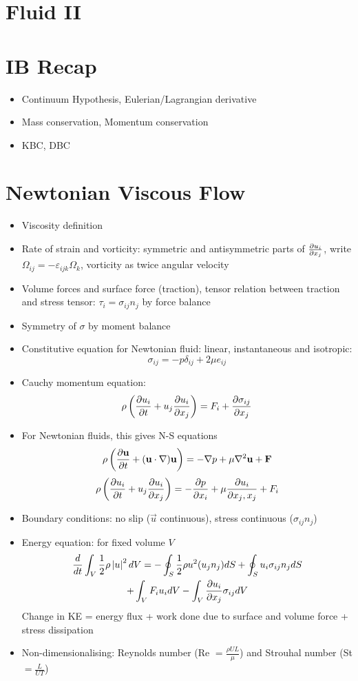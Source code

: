 


\section*{Fluid \hfill II}

\section{IB Recap}
\begin{itemize}
    \item Continuum Hypothesis, Eulerian/Lagrangian derivative
    \item Mass conservation, Momentum conservation
    \item KBC, DBC
\end{itemize}

\section{Newtonian Viscous Flow}
\begin{itemize}
    \item Viscosity definition
    \item Rate of strain and vorticity: symmetric and antisymmetric parts of $\frac{\partial{u_i}}{\partial{x_j}}$, write $\Omega_{ij} = -\varepsilon_{ijk}\Omega_k$, vorticity as twice angular velocity
    \item Volume forces and surface force (traction), tensor relation between traction and stress tensor: $\tau_i = \sigma_{ij} n_j$ by force balance
    \item Symmetry of $\sigma$ by moment balance
    \item Constitutive equation for Newtonian fluid: linear, instantaneous and isotropic: \[\sigma_{ij} = -p\delta_{ij} + 2\mu e_{ij}\]
    \item Cauchy momentum equation: \[\rho \left(\frac{\partial{u_i}}{\partial{t}} + u_j \frac{\partial{u_i}}{\partial{x_j}}\right) = F_i + \frac{\partial{\sigma_{ij}}}{\partial{x_j}} \]
    \item For Newtonian fluids, this gives N-S equations
          \[\rho \left( \frac{\partial{\boldsymbol{\mathbf{u}}}}{\partial{t}}  + (\boldsymbol{\mathbf{u}} \cdot \nabla)\boldsymbol{\mathbf{u}}  \right) = -\mathbf{\nabla} p + \mu \nabla^2 \boldsymbol{\mathbf{u}} + \boldsymbol{\mathbf{F}} \]
          \[\rho \left( \frac{\partial{u_i}}{\partial{t}}  + u_j \frac{\partial{u_i}}{\partial{x_j}} \right) = -\frac{\partial{p}}{\partial{x_i}} + \mu \frac{\partial{u_i}}{\partial{x_j,x_j}} + F_i \]
    \item Boundary conditions: no slip ($\vec{u}$ continuous), stress continuous ($\sigma_{ij} n_j$)
    \item Energy equation: for fixed volume $V$
          \begin{multline*}
            \frac{d}{dt} \int_V \frac12 \rho \left| u \right|^2 dV = - \oint_S \frac12 \rho u^2 (u_j n_j) dS + \oint_S u_i \sigma_{ij} n_j dS  \\
             + \int_V F_i u_i dV - \int_V \frac{\partial{u_i}}{\partial{x_j}}\sigma_{ij} dV  
          \end{multline*} 
          Change in KE = energy flux + work done due to surface and volume force + stress dissipation
    \item Non-dimensionalising: Reynolds number (Re $= \frac{\rho UL}{\mu}$) and Strouhal number (St $= \frac{L}{UT}$)
\end{itemize}
